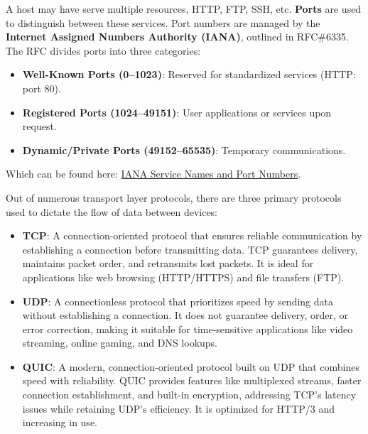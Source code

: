\newpage 

\begin{Def}[Ports]

    A host may have serve multiple resources, HTTP, FTP, SSH, etc. \textbf{Ports} are used to distinguish between these services.
    Port numbers are managed by the \textbf{Internet Assigned Numbers Authority (IANA)}, outlined in RFC\#6335. The RFC divides ports into three categories:
    \begin{itemize}
        \item \textbf{Well-Known Ports (0–1023)}: Reserved for standardized services (HTTP: port 80).
        \item \textbf{Registered Ports (1024–49151)}: User applications or services upon request.
        \item \textbf{Dynamic/Private Ports (49152–65535)}: Temporary communications. \hfill \cite{rfc6335}
    \end{itemize}
    \noindent
    Which can be found here: \href{https://www.iana.org/assignments/service-names-port-numbers/service-names-port-numbers.xhtml}{IANA Service Names and Port Numbers}.
\end{Def}

\vspace{-.25em}
\begin{Def}

    Out of numerous transport layer protocols, there are three primary protocols used to dictate the flow of data between devices:
    \begin{itemize}
        \item \textbf{TCP}: A connection-oriented protocol that ensures reliable communication by establishing a connection before transmitting data. TCP guarantees delivery, maintains packet order, and retransmits lost packets. It is ideal for applications like web browsing (HTTP/HTTPS) and file transfers (FTP). \hfill \cite{rfc793}
        \item \textbf{UDP}: A connectionless protocol that prioritizes speed by sending data without establishing a connection. It does not guarantee delivery, order, or error correction, making it suitable for time-sensitive applications like video streaming, online gaming, and DNS lookups. \hfill \cite{rfc768}
        \item \textbf{QUIC}: A modern, connection-oriented protocol built on UDP that combines speed with reliability. QUIC provides features like multiplexed streams, faster connection establishment, and built-in encryption, addressing TCP's latency issues while retaining UDP's efficiency. It is optimized for HTTP/3 and increasing in use. \hfill \cite{rfc9000}
    \end{itemize}
\end{Def}

